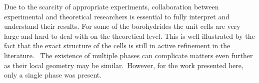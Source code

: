 Due to the scarcity of appropriate experiments, collaboration between experimental and theoretical researchers is essential to fully interpret and understand their results.
For some of the borohydrides the unit cells are very large and hard to deal with on the theoretical level.
This is well illustrated by the fact that the exact structure of the cells is still in active refinement in the literature.~\cite{cabh42-structure-p42m, cabh42-structure-p4}
The existence of multiple phases can complicate matters even further as their local geometry may be similar.~
However, for the work presented here, only a single phase was present.



